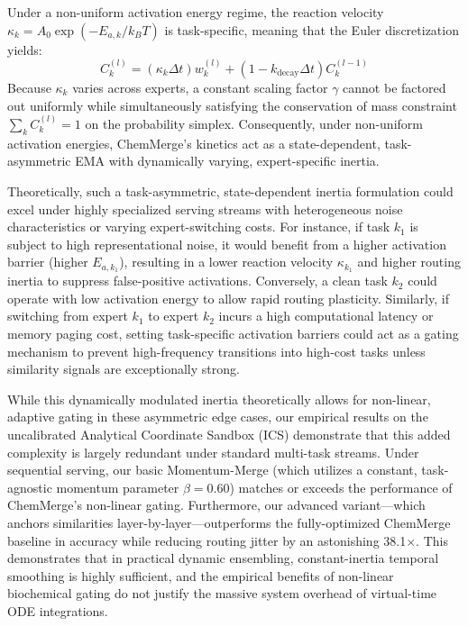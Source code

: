 Under a non-uniform activation energy regime, the reaction velocity $\kappa_k = A_0 \exp\left(-E_{a, k} / k_B T\right)$ is task-specific, meaning that the Euler discretization yields:
\begin{equation}
    C_k^{(l)} = (\kappa_k \Delta t) w_k^{(l)} + (1 - k_{\text{decay}} \Delta t) C_k^{(l-1)}
\end{equation}
Because $\kappa_k$ varies across experts, a constant scaling factor $\gamma$ cannot be factored out uniformly while simultaneously satisfying the conservation of mass constraint $\sum_k C_k^{(l)} = 1$ on the probability simplex. Consequently, under non-uniform activation energies, ChemMerge's kinetics act as a state-dependent, task-asymmetric EMA with dynamically varying, expert-specific inertia. 

Theoretically, such a task-asymmetric, state-dependent inertia formulation could excel under highly specialized serving streams with heterogeneous noise characteristics or varying expert-switching costs. For instance, if task $k_1$ is subject to high representational noise, it would benefit from a higher activation barrier (higher $E_{a, k_1}$), resulting in a lower reaction velocity $\kappa_{k_1}$ and higher routing inertia to suppress false-positive activations. Conversely, a clean task $k_2$ could operate with low activation energy to allow rapid routing plasticity. Similarly, if switching from expert $k_1$ to expert $k_2$ incurs a high computational latency or memory paging cost, setting task-specific activation barriers could act as a gating mechanism to prevent high-frequency transitions into high-cost tasks unless similarity signals are exceptionally strong.

While this dynamically modulated inertia theoretically allows for non-linear, adaptive gating in these asymmetric edge cases, our empirical results on the uncalibrated Analytical Coordinate Sandbox (ICS) demonstrate that this added complexity is largely redundant under standard multi-task streams. Under sequential serving, our basic Momentum-Merge (which utilizes a constant, task-agnostic momentum parameter $\beta = 0.60$) matches or exceeds the performance of ChemMerge's non-linear gating. Furthermore, our advanced variant—which anchors similarities layer-by-layer—outperforms the fully-optimized ChemMerge baseline in accuracy while reducing routing jitter by an astonishing 38.1$\times$. This demonstrates that in practical dynamic ensembling, constant-inertia temporal smoothing is highly sufficient, and the empirical benefits of non-linear biochemical gating do not justify the massive system overhead of virtual-time ODE integrations.


